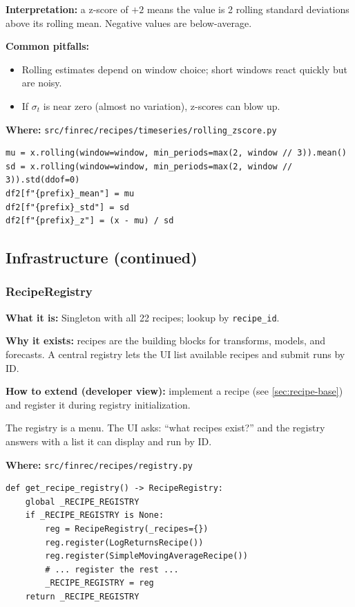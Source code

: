 \documentclass[11pt,a4paper]{article}
\begin{document}
\textbf{Interpretation:} a z-score of \(+2\) means the value is 2 rolling standard deviations above its rolling mean. Negative values are below-average.

\textbf{Common pitfalls:}
\begin{itemize}[leftmargin=2em]
  \item Rolling estimates depend on window choice; short windows react quickly but are noisy.
  \item If \(\sigma_t\) is near zero (almost no variation), z-scores can blow up.
\end{itemize}

\textbf{Where:} \texttt{src/finrec/recipes/timeseries/rolling\_zscore.py}

\begin{lstlisting}
mu = x.rolling(window=window, min_periods=max(2, window // 3)).mean()
sd = x.rolling(window=window, min_periods=max(2, window // 3)).std(ddof=0)
df2[f"{prefix}_mean"] = mu
df2[f"{prefix}_std"] = sd
df2[f"{prefix}_z"] = (x - mu) / sd
\end{lstlisting}

\subsection{Infrastructure (continued)}

\subsubsection{RecipeRegistry}\label{sec:recipe-registry}

\textbf{What it is:} Singleton with all 22 recipes; lookup by \texttt{recipe\_id}.

\textbf{Why it exists:} recipes are the building blocks for transforms, models, and forecasts. A central registry lets the UI list available recipes and submit runs by ID.

\textbf{How to extend (developer view):} implement a recipe (see \ref{sec:recipe-base}) and register it during registry initialization.

\begin{intuitionbox}
The registry is a menu. The UI asks: ``what recipes exist?'' and the registry answers with a list it can display and run by ID.
\end{intuitionbox}

\textbf{Where:} \texttt{src/finrec/recipes/registry.py}

\begin{lstlisting}
def get_recipe_registry() -> RecipeRegistry:
    global _RECIPE_REGISTRY
    if _RECIPE_REGISTRY is None:
        reg = RecipeRegistry(_recipes={})
        reg.register(LogReturnsRecipe())
        reg.register(SimpleMovingAverageRecipe())
        # ... register the rest ...
        _RECIPE_REGISTRY = reg
    return _RECIPE_REGISTRY
\end{lstlisting}
\end{document}
